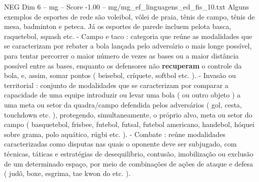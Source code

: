 \begin{textsample}{NEG Dim 6 – mg – Score -1.00 – mg/mg\_ef\_linguagens\_ed\_fis\_10.txt}
Alguns exemplos de esportes de rede são voleibol, vôlei de praia, tênis de campo, tênis de mesa, badminton e peteca.
Já os esportes de parede incluem pelota basca, raquetebol, squash etc. - Campo e taco : categoria que reúne as modalidades que se caracterizam por rebater a bola lançada pelo adversário o mais longe possível, para tentar percorrer o maior número de vezes as bases ou a maior distância possível entre as bases, enquanto os defensores não \textbf{recuperam} o controle da bola, e, assim, somar pontos ( beisebol, críquete, softbol etc. ). - Invasão ou territorial : conjunto de modalidades que se caracterizam por comparar a capacidade de uma equipe introduzir ou levar uma bola ( ou outro objeto ) a uma meta ou setor da quadra/campo defendida pelos adversários ( gol, cesta, touchdown etc. ), protegendo, simultaneamente, o próprio alvo, meta ou setor do campo ( basquetebol, frisbee, futebol, futsal, futebol americano, handebol, hóquei sobre grama, polo aquático, rúgbi etc. ). - Combate : reúne modalidades caracterizadas como disputas nas quais o oponente deve ser subjugado, com técnicas, táticas e estratégias de desequilíbrio, contusão, imobilização ou exclusão de um determinado espaço, por meio de combinações de ações de ataque e defesa ( judô, boxe, esgrima, tae kwon do etc. ).

\end{textsample}
